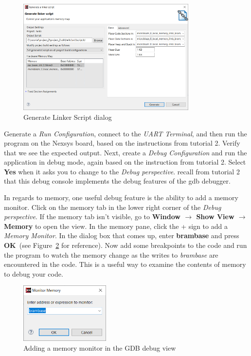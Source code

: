 \documentclass[11pt]{article}
\begin{document}
\begin{figure}[h]
    \centering
    \includegraphics[width=0.8\textwidth]{images/gen_linker_script.png}
    \caption{Generate Linker Script dialog}
    \label{fig:gen_linker_script}
\end{figure}

Generate a \textit{Run Configuration}, connect to the \textit{UART Terminal}, and then run the program on the Nexsys board, based on the instructions from tutorial 2. Verify that we see the expected output. Next, create a \textit{Debug Configuration} and run the application in debug mode, again based on the instruction from tutorial 2. Select \textbf{Yes} when it asks you to change to the \textit{Debug perspective}. recall from tutorial 2 that this debug console implements the debug features of the gdb debugger. 

In regards to memory, one useful debug feature is the ability to add a memory monitor. Click on the memory tab in the lower right corner of the \textit{Debug perspective}. If the memory tab isn't visible, go to \textbf{Window $\rightarrow$ Show View $\rightarrow$ Memory} to open the view. In the memory pane, click the + sign to add a \textit{Memory Monitor}. In the dialog box that comes up, enter \textbf{brambase} and press \textbf{OK}~(see Figure~\ref{fig:add_mem_mon} for reference). Now add some breakpoints to the code and run the program to watch the memory change as the writes to \textit{brambase} are encountered in the code. This is a useful way to examine the contents of memory to debug your code.

\begin{figure}[h]
    \centering
    \includegraphics[width=0.4\textwidth]{images/add_mem_mon.png}
    \caption{Adding a memory monitor in the GDB debug view}
    \label{fig:add_mem_mon}
\end{figure}
\end{document}
